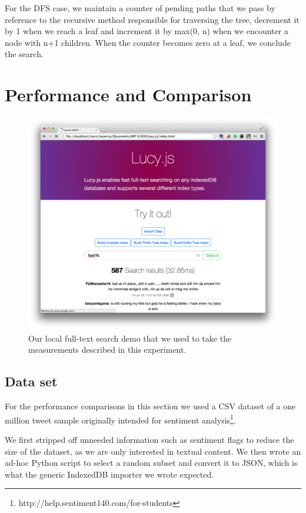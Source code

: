 \documentclass{vldb}
\begin{document}
For the DFS case, we maintain a counter of pending paths that we pass by reference to the recursive method responsible for traversing the tree, decrement it by 1 when we reach a leaf and increment it by max(0, n) when we encounter a node with n+1 children. When the counter becomes zero at a leaf, we conclude the search.

\section{Performance and Comparison}

\begin{figure}
   \includegraphics[scale=.2]{search-screenshot}
  \caption{Our local full-text search demo that we used to take the measurements described in this experiment.}
\end{figure}

\subsection{Data set}

For the performance comparisons in this section we used a CSV dataset of a one million tweet sample originally intended for sentiment analysis\footnote{http://help.sentiment140.com/for-students}.

We first stripped off unneeded information such as sentiment flags to reduce the size of the dataset, as we are only interested in textual content. We then wrote an ad-hoc Python script to select a random subset and convert it to JSON, which is what the generic IndexedDB importer we wrote expected.
\end{document}
